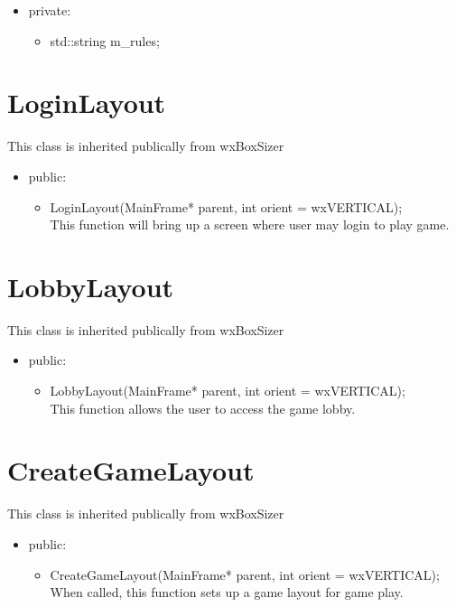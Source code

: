 \documentclass[]{scrartcl}
\begin{document}
	\begin{itemize}
		\item 	private:
		\begin{itemize}
			\item std::string m\_rules;
		\end{itemize}
	\end{itemize}


\section{LoginLayout }
	This class is inherited  publically from wxBoxSizer
	\begin{itemize}
		\item public:
		\begin{itemize}
			\item	LoginLayout(MainFrame* parent, int orient = wxVERTICAL);
				\\This function will bring up a screen where user may login to play game.
		\end{itemize}
	\end{itemize}



\section{LobbyLayout}
	This class is inherited  publically from wxBoxSizer
		\begin{itemize}
			\item public:
			\begin{itemize}
				\item	LobbyLayout(MainFrame* parent, int orient = wxVERTICAL);
					\\This function allows the user to access the game lobby.
			\end{itemize}
		\end{itemize}

\section{CreateGameLayout}
	This class is inherited  publically from wxBoxSizer

		\begin{itemize}
			\item public:
			\begin{itemize}
				\item	CreateGameLayout(MainFrame* parent, int orient = wxVERTICAL);
					\\When called, this function sets up a game layout for game play.
			\end{itemize}
		\end{itemize}
\end{document}
